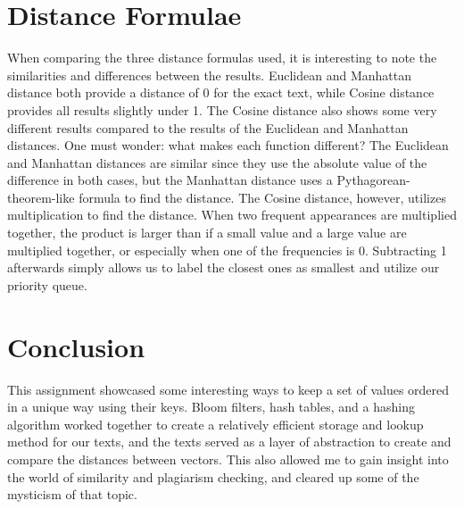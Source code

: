 \documentclass[12pt]{article}
\begin{document}
\section{Distance Formulae}
When comparing the three distance formulas used, it is interesting to note the similarities and differences between the results. Euclidean and Manhattan distance both provide a distance of 0 for the exact text, while Cosine distance provides all results slightly under 1. The Cosine distance also shows some very different results compared to the results of the Euclidean and Manhattan distances. One must wonder: what makes each function different? The Euclidean and Manhattan distances are similar since they use the absolute value of the difference in both cases, but the Manhattan distance uses a Pythagorean-theorem-like formula to find the distance. The Cosine distance, however, utilizes multiplication to find the distance. When two frequent appearances are multiplied together, the product is larger than if a small value and a large value are multiplied together, or especially when one of the frequencies is 0. Subtracting 1 afterwards simply allows us to label the closest ones as smallest and utilize our priority queue.

\section{Conclusion}
This assignment showcased some interesting ways to keep a set of values ordered in a unique way using their keys. Bloom filters, hash tables, and a hashing algorithm worked together to create a relatively efficient storage and lookup method for our texts, and the texts served as a layer of abstraction to create and compare the distances between vectors. This also allowed me to gain insight into the world of similarity and plagiarism checking, and cleared up some of the mysticism of that topic.
\end{document}
